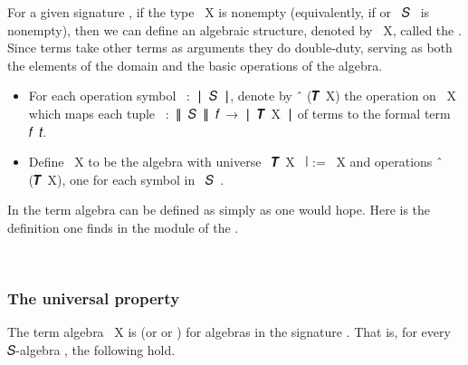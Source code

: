 For a given signature , if the type ~\ab X is nonempty
(equivalently, if  or ~\ab 𝑆~ is nonempty), then we can define
an algebraic structure, denoted by ~\ab X, called the    . Since terms take other terms
as arguments they do double-duty, serving as both the elements of the domain and the basic
operations of the algebra.

\begin{itemize}
\item For each operation symbol ~\as :~\af ∣~\ab 𝑆~\af ∣, denote by
  ~\af ̂ (\af 𝑻~\ab X) the operation on ~\ab X which maps each tuple
  ~\as :~\af ∥~\ab 𝑆~\af ∥~\ab 𝑓~\as →~\af ∣~\af 𝑻~\ab X~\af ∣ of terms to the
  formal term \ab 𝑓~\ab 𝑡. 
\item Define ~\ab X to be the algebra with universe ~\af 𝑻~\ab X~\af
  ∣ := ~\ab X and operations ~\af ̂ (\af 𝑻~\ab X), one for each
  symbol  in ~\ab 𝑆~. 
\end{itemize}

In \agda the term algebra can be defined as simply as one would hope.  Here is
the definition one finds in the \ualibTermsBasic module of the \ualib.
\ccpad
\begin{code}%
\>[0]\AgdaSpace{}%
\AgdaSymbol{:}\AgdaSpace{}%
\AgdaSymbol{\{}\AgdaSpace{}%
\AgdaSymbol{:}\AgdaSpace{}%
\AgdaSymbol{\}(}\AgdaSpace{}%
\AgdaSymbol{:}\AgdaSpace{}%
\AgdaSpace{}%
\AgdaSpace{}%
\AgdaSymbol{)}\AgdaSpace{}%
\AgdaSpace{}%
\AgdaSpace{}%
\AgdaSymbol{(}\AgdaSpace{}%
\AgdaSymbol{)}\AgdaSpace{}%
\<%
\\
\>[0]\AgdaSpace{}%
\AgdaSpace{}%
\AgdaSymbol{=}\AgdaSpace{}%
\AgdaSpace{}%
\AgdaSpace{}%
\AgdaOperator{\AgdaInductiveConstructor{,}}\AgdaSpace{}%
\<%
\end{code}

\subsubsection{The universal property}\label{the-universal-property}

The term algebra ~\ab X is  (or  or
) for algebras in the signature . That is, for every
𝑆-algebra , the following hold. 

